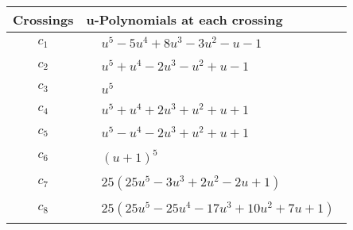 \documentclass[1p]{elsarticle_modified}
\theoremstyle{definition}
\begin{document}
\begin{tabular}{m{50pt}|m{274pt}}
Crossings & \hspace{64pt}u-Polynomials at each crossing \\
\hline $$\begin{aligned}c_{1}\end{aligned}$$&$\begin{aligned}
&u^5-5 u^4+8 u^3-3 u^2- u-1
\end{aligned}$\\
\hline $$\begin{aligned}c_{2}\end{aligned}$$&$\begin{aligned}
&u^5+u^4-2 u^3- u^2+u-1
\end{aligned}$\\
\hline $$\begin{aligned}c_{3}\end{aligned}$$&$\begin{aligned}
&u^5
\end{aligned}$\\
\hline $$\begin{aligned}c_{4}\end{aligned}$$&$\begin{aligned}
&u^5+u^4+2 u^3+u^2+u+1
\end{aligned}$\\
\hline $$\begin{aligned}c_{5}\end{aligned}$$&$\begin{aligned}
&u^5- u^4-2 u^3+u^2+u+1
\end{aligned}$\\
\hline $$\begin{aligned}c_{6}\end{aligned}$$&$\begin{aligned}
&(u+1)^5
\end{aligned}$\\
\hline $$\begin{aligned}c_{7}\end{aligned}$$&$\begin{aligned}
&25(25 u^5-3 u^3+2 u^2-2 u+1)
\end{aligned}$\\
\hline $$\begin{aligned}c_{8}\end{aligned}$$&$\begin{aligned}
&25(25 u^5-25 u^4-17 u^3+10 u^2+7 u+1)
\end{aligned}$\\

\end{tabular}
\end{document}
